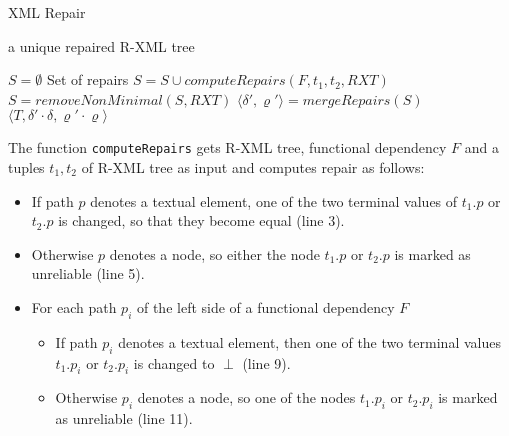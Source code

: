 \begin{algorithm}
\caption{XML Repair}
\label{repAlgo}
\begin{algorithmic}[1]
\ENSURE a unique repaired R-XML tree

\STATE $S = \emptyset$ \COMMENT Set of repairs
		\STATE $S = S \cup computeRepairs(F, t_1, t_2, RXT)$
	\ENDFOR
\ENDFOR
\STATE $S = removeNonMinimal(S, RXT)$
\STATE $\langle \delta', \varrho' \rangle = mergeRepairs(S)$
\RETURN $\langle T, \delta' \cdot \delta, \varrho' \cdot \varrho \rangle$
\end{algorithmic}
\end{algorithm}

The function \texttt{computeRepairs} gets R-XML tree, functional dependency $F$ and a tuples $t_1, t_2$ of R-XML tree as input and computes repair as follows:
\begin{itemize}
	\item If path $p$ denotes a textual element, one of the two terminal values of $t_1.p$ or $t_2.p$ is changed, so that they become equal (line 3).
	\item Otherwise $p$ denotes a node, so either the node $t_1.p$ or $t_2.p$ is marked as unreliable (line 5).
	\item For each path $p_i$ of the left side of a functional dependency $F$
	\begin{itemize}
		\item If path $p_i$ denotes a textual element, then one of the two terminal values $t_1.p_i$ or $t_2.p_i$ is changed to $\perp$ (line 9).
		\item Otherwise $p_i$ denotes a node, so one of the nodes $t_1.p_i$ or $t_2.p_i$ is marked as unreliable (line 11).
	\end{itemize}
\end{itemize}

